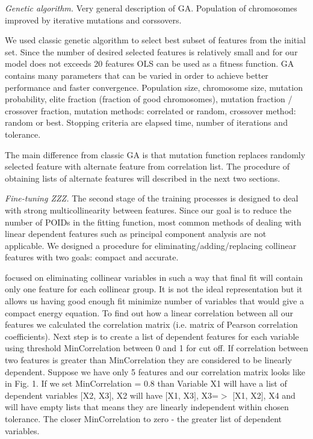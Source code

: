 \documentclass[aps,prl,reprint,amsmath,amssymb,nature]{revtex4-1}
\begin{document}
\textit{Genetic algorithm.}\textbf{ }Very general description of GA. 
Population of chromosomes improved by iterative mutations and 
corssovers.

We used classic genetic algorithm to select best subset of features from 
the initial set. Since the number of desired selected features is 
relatively small and for our model does not exceeds 20 features OLS can 
be used as a fitness function. GA contains many parameters that can be 
varied in order to achieve better performance and faster convergence. 
Population size, chromosome size, mutation probability, elite fraction 
(fraction of good chromosomes), mutation fraction / crossover fraction, 
mutation methods: correlated or random, crossover method: random or 
best. Stopping criteria are elapsed time, number of iterations and 
tolerance. 

The main difference from classic GA is that mutation function replaces 
randomly selected feature with alternate feature from correlation list. 
The procedure of obtaining lists of alternate features will described in 
the next two sections.

\textit{Fine-tuning ZZZ.} The second stage of the training processes 
is designed to deal with strong multicollinearity between features. 
Since our goal is to reduce the number of POIDs in the fitting function, 
most common methods of dealing with linear dependent features such as 
principal component analysis are not applicable. We designed a procedure 
for eliminating/adding/replacing collinear features with two goals: 
compact and accurate. 

focused on eliminating collinear variables in such a way that final fit 
will contain only one feature for each collinear group. It is not the 
ideal representation but it allows us having good enough fit minimize 
number of variables that would give a compact energy equation. To find 
out how a linear correlation between all our features we calculated 
the correlation matrix (i.e. matrix of Pearson correlation coefficients). Next step is to 
create a list of dependent features for each variable using threshold 
MinCorrelation between 0 and 1 for cut off. If correlation between two 
features is greater than MinCorrelation they are considered to be 
linearly dependent. Suppose we have only 5 features and our correlation 
matrix looks like in Fig. 1. If we set MinCorrelation = 0.8 than 
Variable X1 will have a list of dependent variables $[$X2, X3$]$, X2 
will have $[$X1, X3$]$, X3=$>$ $[$X1, X2$]$, X4 and will have empty 
lists that means they are linearly independent within chosen tolerance. 
The closer MinCorrelation to zero - the greater list of dependent 
variables. 
\end{document}
